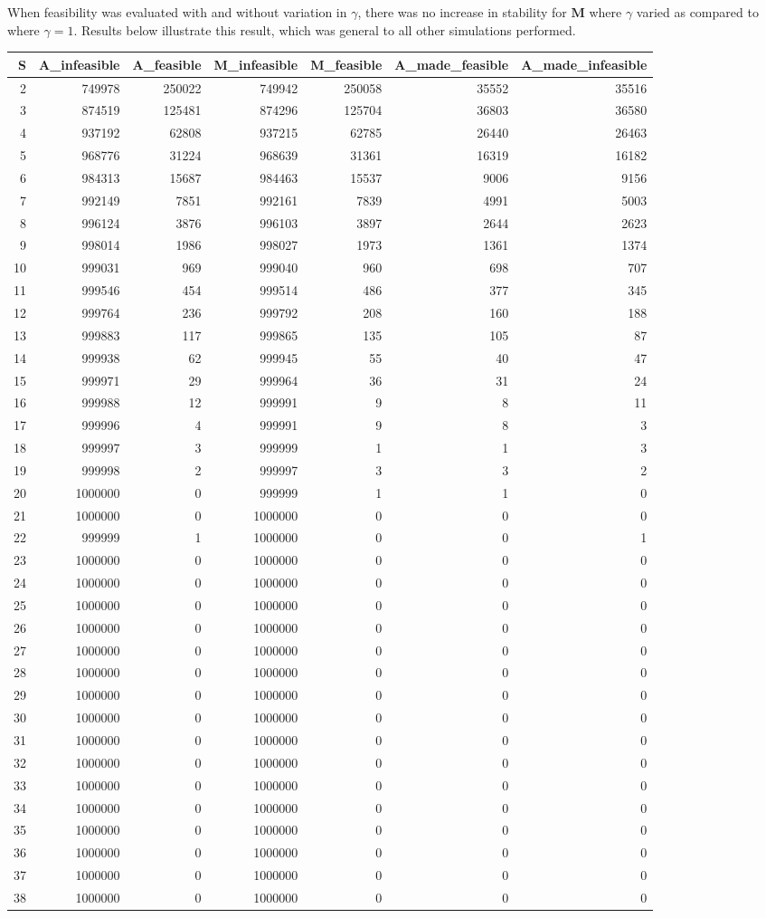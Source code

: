 \documentclass[]{article}
\begin{document}
When feasibility was evaluated with and without variation in \(\gamma\),
there was no increase in stability for \(\mathbf{M}\) where \(\gamma\)
varied as compared to where \(\gamma = 1\). Results below illustrate
this result, which was general to all other simulations performed.

\begin{longtable}[]{@{}rrrrrrr@{}}
\toprule
S & A\_infeasible & A\_feasible & M\_infeasible & M\_feasible &
A\_made\_feasible & A\_made\_infeasible\tabularnewline
\midrule
\endhead
2 & 749978 & 250022 & 749942 & 250058 & 35552 & 35516\tabularnewline
3 & 874519 & 125481 & 874296 & 125704 & 36803 & 36580\tabularnewline
4 & 937192 & 62808 & 937215 & 62785 & 26440 & 26463\tabularnewline
5 & 968776 & 31224 & 968639 & 31361 & 16319 & 16182\tabularnewline
6 & 984313 & 15687 & 984463 & 15537 & 9006 & 9156\tabularnewline
7 & 992149 & 7851 & 992161 & 7839 & 4991 & 5003\tabularnewline
8 & 996124 & 3876 & 996103 & 3897 & 2644 & 2623\tabularnewline
9 & 998014 & 1986 & 998027 & 1973 & 1361 & 1374\tabularnewline
10 & 999031 & 969 & 999040 & 960 & 698 & 707\tabularnewline
11 & 999546 & 454 & 999514 & 486 & 377 & 345\tabularnewline
12 & 999764 & 236 & 999792 & 208 & 160 & 188\tabularnewline
13 & 999883 & 117 & 999865 & 135 & 105 & 87\tabularnewline
14 & 999938 & 62 & 999945 & 55 & 40 & 47\tabularnewline
15 & 999971 & 29 & 999964 & 36 & 31 & 24\tabularnewline
16 & 999988 & 12 & 999991 & 9 & 8 & 11\tabularnewline
17 & 999996 & 4 & 999991 & 9 & 8 & 3\tabularnewline
18 & 999997 & 3 & 999999 & 1 & 1 & 3\tabularnewline
19 & 999998 & 2 & 999997 & 3 & 3 & 2\tabularnewline
20 & 1000000 & 0 & 999999 & 1 & 1 & 0\tabularnewline
21 & 1000000 & 0 & 1000000 & 0 & 0 & 0\tabularnewline
22 & 999999 & 1 & 1000000 & 0 & 0 & 1\tabularnewline
23 & 1000000 & 0 & 1000000 & 0 & 0 & 0\tabularnewline
24 & 1000000 & 0 & 1000000 & 0 & 0 & 0\tabularnewline
25 & 1000000 & 0 & 1000000 & 0 & 0 & 0\tabularnewline
26 & 1000000 & 0 & 1000000 & 0 & 0 & 0\tabularnewline
27 & 1000000 & 0 & 1000000 & 0 & 0 & 0\tabularnewline
28 & 1000000 & 0 & 1000000 & 0 & 0 & 0\tabularnewline
29 & 1000000 & 0 & 1000000 & 0 & 0 & 0\tabularnewline
30 & 1000000 & 0 & 1000000 & 0 & 0 & 0\tabularnewline
31 & 1000000 & 0 & 1000000 & 0 & 0 & 0\tabularnewline
32 & 1000000 & 0 & 1000000 & 0 & 0 & 0\tabularnewline
33 & 1000000 & 0 & 1000000 & 0 & 0 & 0\tabularnewline
34 & 1000000 & 0 & 1000000 & 0 & 0 & 0\tabularnewline
35 & 1000000 & 0 & 1000000 & 0 & 0 & 0\tabularnewline
36 & 1000000 & 0 & 1000000 & 0 & 0 & 0\tabularnewline
37 & 1000000 & 0 & 1000000 & 0 & 0 & 0\tabularnewline
38 & 1000000 & 0 & 1000000 & 0 & 0 & 0\tabularnewline

\end{longtable}
\end{document}
